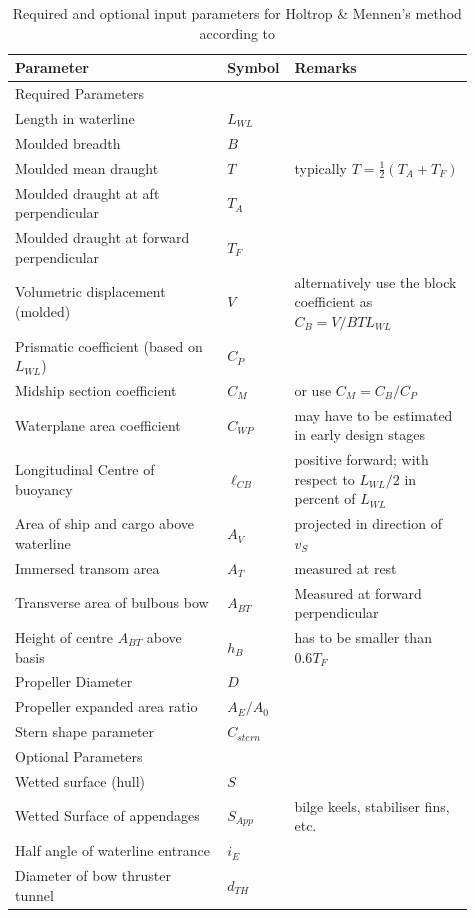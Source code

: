 \begin{table}[ht]
    \footnotesize
    \centering
    {\begin{tabular}{ p{0.45\linewidth} p{0.08\linewidth} p{0.38\linewidth}  }
    \hline
    \textbf{Parameter} & \textbf{Symbol} & \textbf{Remarks} \\
    \hline
    Required Parameters&&\\
    \hline
    Length in waterline & $L_{WL}$\\
    Moulded breadth & $B$ \\
    Moulded mean draught & $T$ & typically $T = \frac{1}{2}(T_A+T_F)$ \\
    Moulded draught at aft perpendicular & $T_A$ & \\ 
    Moulded draught at forward perpendicular & $T_F$\\
    Volumetric displacement (molded) & $V$ & alternatively use the block \mbox{coefficient} as $C_B = V/BTL_{WL}$\\
    Prismatic coefficient (based on $L_{WL}$) & $C_P$ \\
    Midship section coefficient & $C_M$ & or use $C_M=C_B/C_P$ \\
    Waterplane area coefficient & $C_{WP}$ & may have to be estimated in early design stages\\
    Longitudinal Centre of buoyancy & $\ell_{CB}$ &positive forward; with respect to $L_{WL}/2$ in percent of $L_{WL}$\\
    Area of ship and cargo above waterline & $A_V$ & projected in direction of $v_S$\\
    Immersed transom area & $A_T$ & measured at rest\\
    Transverse area of bulbous bow & $A_{BT}$ & Measured at forward perpendicular \\
    Height of centre $A_{BT}$ above basis & $h_B$ & has to be smaller than $0.6T_F$ \\
    Propeller Diameter & $D$ \\
    Propeller expanded area ratio & $A_E/A_0$ \\
    Stern shape parameter & $C_{stern}$ \\
    \hline
    Optional Parameters&&\\
    \hline
    Wetted surface (hull) & $S$\\
    Wetted Surface of appendages & $S_{App}$ & bilge keels, stabiliser fins, etc.\\
    Half angle of waterline entrance & $i_E$ \\
    Diameter of bow thruster tunnel & $d_{TH}$ \\
    \hline
    \end{tabular}}
\caption{Required and optional input parameters for Holtrop \& Mennen's method according to }
\label{tbl:holtrop_params}
\end{table}

